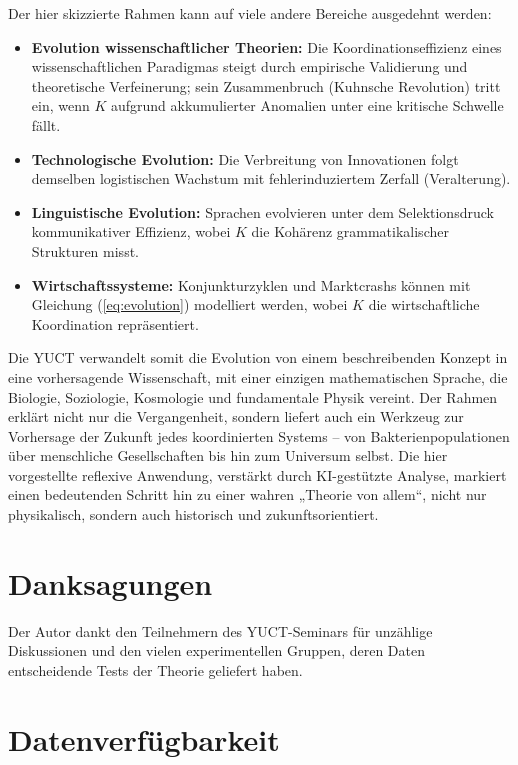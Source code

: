 \documentclass[12pt,a4paper]{article}
\theoremstyle{remark}
\begin{document}
	Der hier skizzierte Rahmen kann auf viele andere Bereiche ausgedehnt werden:
	\begin{itemize}
		\item \textbf{Evolution wissenschaftlicher Theorien:} Die Koordinationseffizienz eines wissenschaftlichen Paradigmas steigt durch empirische Validierung und theoretische Verfeinerung; sein Zusammenbruch (Kuhnsche Revolution) tritt ein, wenn $K$ aufgrund akkumulierter Anomalien unter eine kritische Schwelle fällt.
		\item \textbf{Technologische Evolution:} Die Verbreitung von Innovationen folgt demselben logistischen Wachstum mit fehlerinduziertem Zerfall (Veralterung).
		\item \textbf{Linguistische Evolution:} Sprachen evolvieren unter dem Selektionsdruck kommunikativer Effizienz, wobei $K$ die Kohärenz grammatikalischer Strukturen misst.
		\item \textbf{Wirtschaftssysteme:} Konjunkturzyklen und Marktcrashs können mit Gleichung (\ref{eq:evolution}) modelliert werden, wobei $K$ die wirtschaftliche Koordination repräsentiert.
	\end{itemize}
	
	Die YUCT verwandelt somit die Evolution von einem beschreibenden Konzept in eine vorhersagende Wissenschaft, mit einer einzigen mathematischen Sprache, die Biologie, Soziologie, Kosmologie und fundamentale Physik vereint. Der Rahmen erklärt nicht nur die Vergangenheit, sondern liefert auch ein Werkzeug zur Vorhersage der Zukunft jedes koordinierten Systems – von Bakterienpopulationen über menschliche Gesellschaften bis hin zum Universum selbst. Die hier vorgestellte reflexive Anwendung, verstärkt durch KI-gestützte Analyse, markiert einen bedeutenden Schritt hin zu einer wahren „Theorie von allem“, nicht nur physikalisch, sondern auch historisch und zukunftsorientiert.
	
	\section*{Danksagungen}
	
	Der Autor dankt den Teilnehmern des YUCT-Seminars für unzählige Diskussionen und den vielen experimentellen Gruppen, deren Daten entscheidende Tests der Theorie geliefert haben.
	
	\section*{Datenverfügbarkeit}
	
\end{document}
